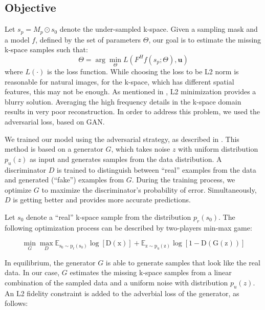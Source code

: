 \documentclass[review]{elsarticle}
\begin{document}
\subsection{Objective}

Let $s_{p}=M_{p}\odot s_{0}$ denote the under-sampled k-space. Given
a sampling mask and a model $f$, defined by the set of parameters
$\Theta$, our goal is to estimate the missing k-space samples such
that: 
\begin{equation}
\Theta=\arg\min_{\Theta}L(F^{H}f\left(s_{p};\Theta\right),\boldsymbol{u})
\end{equation}
where $L\left(\cdot\right)$ is the loss function. While choosing
the loss to be L2 norm is reasonable for natural images, for the k-space,
which has different spatial features, this may not be enough. As mentioned
in \cite{pathak2016context}, L2 minimization provides a blurry solution.
Averaging the high frequency details in the k-space domain results
in very poor reconstruction. In order to address this problem, we
used the adversarial loss, based on GAN.

We trained our model using the adversarial strategy, as described
in \cite{goodfellow2014generative,radford2015unsupervised}. This
method is based on a generator $G$, which takes noise \textbf{$z$
}with uniform distribution \textbf{$p_{u}\left(z\right)$} as input
and generates samples from the data distribution. A discriminator
$D$ is trained to distinguish between ``real'' examples from the
data and generated (``fake'') examples from $G.$ During the training
process, we optimize $G$ to maximize the discriminator's probability
of error. Simultaneously, $D$ is getting better and provides more
accurate predictions.

Let $s_{0}$ denote a ``real'' k-space sample from the distribution
$p_{r}\left(s_{0}\right)$. The following optimization process can
be described by two-players min-max game:

\begin{equation}
\min_{G}\max_{D}\mathbb{E_{\mathrm{s_{0}\sim p_{r}\left(s_{0}\right)}}\mathrm{\log\left[D\left(x\right)\right]}}+\mathbb{E_{\mathrm{z\sim p_{u}\left(z\right)}}\mathrm{\log\left[1-D\left(G(z)\right)\right]}}
\end{equation}

In equilibrium, the generator $G$ is able to generate samples that
look like the real data. In our case, $G$ estimates the missing k-space
samples from a linear combination of the sampled data and a uniform
noise with distribution $p_{u}\left(z\right)$. An L2 fidelity constraint
is added to the adverbial loss of the generator, as follows:
\end{document}
